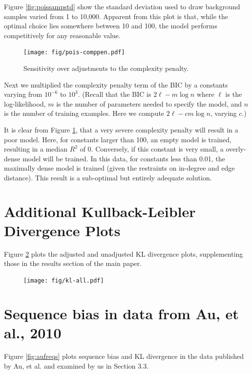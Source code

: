 \documentclass[letterpaper]{article}
\begin{document}
Figure \ref{fig:poissampstd} show the standard deviation used to draw background
samples varied from 1 to 10,000. Apparent from this plot is that, while the
optimal choice lies somewhere between 10 and 100, the model performs
competitively for any reasonable value.


\begin{figure}[H]
\begin{center}
\texttt{[image: fig/pois-comppen.pdf]}
\end{center}
\caption{Sensitivity over adjustments to the complexity penalty.}
\label{fig:poiscomppen}
\end{figure}

Next we multiplied the complexity penalty term of the BIC by a constants varying
from $10^{-6}$ to $10^{3}$. (Recall that the BIC is $2\ell - m \log n$ where
$\ell$ is the log-likelihood, $m$ is the number of parameters needed to specify
the model, and $n$ is the number of training examples. Here we compute $2 \ell -
c m \log n$, varying $c$.)

It is clear from Figure \ref{fig:poiscomppen}, that a very severe complexity
penalty will result in a poor model. Here, for constants larger than 100, an
empty model is trained, resulting in a median $R^2$ of 0. Conversely, if
this constant is very small, a overly-dense model will be trained.  In this
data, for constants less than 0.01, the maximally dense model is trained (given
the restraints on in-degree and edge distance). This result is a sub-optimal but
entirely adequate solution.


\section{Additional Kullback-Leibler Divergence Plots}

Figure \ref{fig:klall} plots the adjusted and unadjusted KL divergence plots,
supplementing those in the results section of the main paper.

\begin{figure}[H]
\centerline{
\texttt{[image: fig/kl-all.pdf]}
}
\caption{}
\label{fig:klall}
\end{figure}


\section{Sequence bias in data from Au, et al., 2010}

Figure \ref{fig:aufreqs} plots sequence bias and KL divergence in the data
published by Au, et al. \cite{Au2010} and examined by us in Section 3.3.
\end{document}
